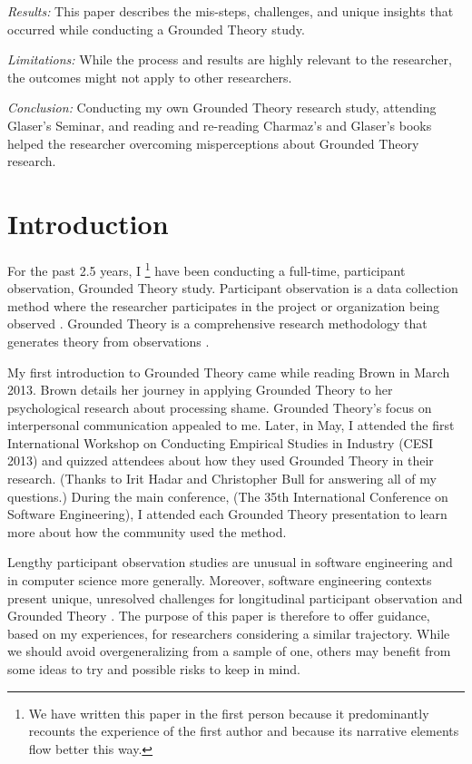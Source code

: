 \textit{Results:} This paper describes the mis-steps, challenges, and unique insights that occurred while conducting a Grounded Theory study.

\textit{Limitations:} While the process and results are highly relevant to the researcher, the outcomes might not apply to other researchers.

\textit{Conclusion:} Conducting my own Grounded Theory research study, attending Glaser's Seminar, and reading and re-reading Charmaz's and Glaser's books helped the researcher overcoming misperceptions about Grounded Theory research.
\section{Introduction}
For the past 2.5 years, I \footnote{We have written this paper in the first person because it predominantly recounts the experience of the first author and because its narrative elements flow better this way.} have been conducting a full-time, participant observation, Grounded Theory study. Participant observation is a data collection method where the researcher participates in the project or organization being observed \cite{Trochim2006ResearchMethods}. Grounded Theory is a comprehensive research methodology that generates theory from observations \cite{GlaserDiscovery}. 

My first introduction to Grounded Theory came while reading Brown \cite{BreneBrownDaringGreatly} in March 2013. Brown details her journey in applying Grounded Theory to her psychological research about processing shame. Grounded Theory's focus on interpersonal communication appealed to me. Later, in May, I attended the first International Workshop on Conducting Empirical Studies in Industry (CESI 2013) and quizzed attendees about how they used Grounded Theory in their research. (Thanks to Irit Hadar and Christopher Bull for answering all of my questions.) During the main conference, (The 35th International Conference on Software Engineering), I attended each Grounded Theory presentation to learn more about how the community used the method.

Lengthy participant observation studies are unusual in software engineering and in computer science more generally. Moreover, software engineering contexts present unique, unresolved challenges for longitudinal participant observation and Grounded Theory \cite{StolGroundedTheory}. The purpose of this paper is therefore to offer guidance, based on my experiences, for researchers considering a similar trajectory. While we should avoid overgeneralizing from a sample of one, others may benefit from some ideas to try and possible risks to keep in mind. 

